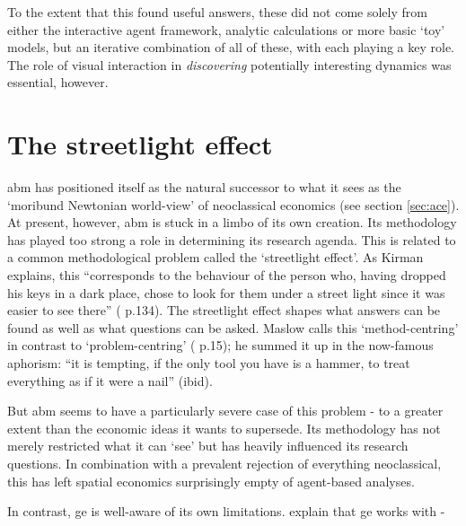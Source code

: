 To the extent that this found useful answers, these did not come solely from either the interactive agent framework, analytic calculations or more basic `toy' models, but an iterative combination of all of these, with each playing a key role. The role of visual interaction in \emph{discovering} potentially interesting dynamics was essential, however.

\section{The streetlight effect \label{sec:streetlight}}

\gls{abm} has positioned itself as the natural successor to what it sees as the `moribund Newtonian world-view' of neoclassical economics (see section \ref{sec:ace}). At present, however, \gls{abm} is stuck in a limbo of its own creation. Its methodology has played too strong a role in determining its research agenda. This is related to a common methodological problem called the `streetlight effect'. As Kirman explains, this ``corresponds to the behaviour of the person who, having dropped his keys in a dark place, chose to look for them under a street light since it was easier to see there'' (\citealt{kirman_whom_1992} p.134). The streetlight effect shapes what answers can be found as well as what questions can be asked. Maslow calls this `method-centring' in contrast to `problem-centring' (\citealt{maslow_psychology_1966} p.15); he summed it up in the now-famous aphorism: ``it is tempting, if the only tool you have is a hammer, to treat everything as if it were a nail'' (ibid). 

But \gls{abm} seems to have a particularly severe case of this problem - to a greater extent than the economic ideas it wants to supersede. Its methodology has not merely restricted what it can `see' but has heavily influenced its research questions. In combination with a prevalent rejection of everything neoclassical, this has left spatial economics surprisingly empty of agent-based analyses. 

In contrast, \gls{ge} is well-aware of its own limitations. \citeauthor{fujita_spatial_2001} explain that \gls{ge} works with - 


